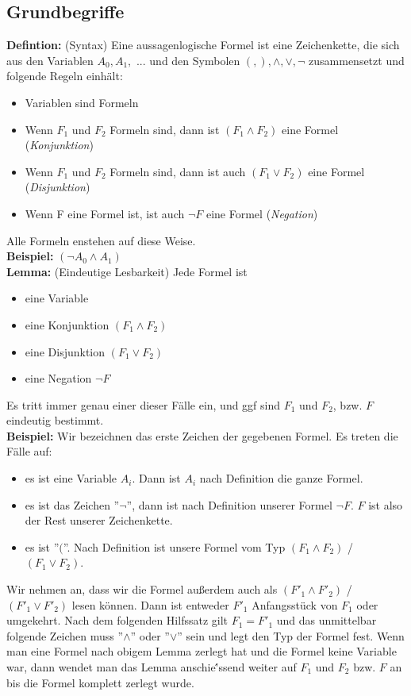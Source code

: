 \documentclass[a4paper]{scrartcl}
\begin{document}
\subsection{Grundbegriffe}
\textbf{Defintion:} (Syntax) Eine aussagenlogische Formel ist eine Zeichenkette, die sich aus den Variablen $A_0, A_1,$ ... und den Symbolen $(, ), \wedge, \vee, \neg$ zusammensetzt und folgende Regeln einhält:
\begin{itemize}
\item Variablen sind Formeln 
\item Wenn $F_1$ und $F_2$ Formeln sind, dann ist $(F_1 \wedge F_2)$ eine Formel (\textit{Konjunktion})
\item Wenn $F_1$ und $F_2$ Formeln sind, dann ist auch $(F_1 \vee F_2)$ eine Formel (\textit{Disjunktion})
\item Wenn F eine Formel ist, ist auch $\neg F$ eine Formel (\textit{Negation})
\end{itemize}
Alle Formeln enstehen auf diese Weise.\\
\textbf{Beispiel:} $(\neg A_0 \wedge A_1)$\\
\textbf{Lemma:} (Eindeutige Lesbarkeit) Jede Formel ist
\begin{itemize}
\item eine Variable
\item eine Konjunktion $(F_1 \wedge F_2)$
\item eine Disjunktion $(F_1 \vee F_2)$
\item eine Negation $\neg F$
\end{itemize}
Es tritt immer genau einer dieser Fälle ein, und ggf sind $F_1$ und $F_2$, bzw. $F$ eindeutig bestimmt.\\
\textbf{Beispiel:} Wir bezeichnen das erste Zeichen der gegebenen Formel. Es treten die Fälle auf:
\begin{itemize}
\item es ist eine Variable $A_i$. Dann ist $A_i$ nach Definition die ganze Formel.
\item es ist das Zeichen ''$\neg$'', dann ist nach Definition unserer Formel $\neg F$. $F$ ist also der Rest unserer Zeichenkette.
\item es ist ''$($''. Nach Definition ist unsere Formel vom Typ $(F_1 \wedge F_2)$ / $(F_1 \vee F_2)$.
\end{itemize}
Wir nehmen an, dass wir die Formel außerdem auch als  $(F'_1 \wedge F'_2)$ / $(F'_1 \vee F'_2)$ lesen können. Dann ist entweder $F'_1$ Anfangsstück von $F_1$ oder umgekehrt. Nach dem folgenden Hilfssatz gilt $F_1 = F'_1$ und das unmittelbar folgende Zeichen muss ''$\wedge$'' oder ''$\vee$'' sein und legt den Typ der Formel fest. Wenn man eine Formel nach obigem Lemma zerlegt hat und die Formel keine Variable war, dann wendet man das Lemma anschie{\''ss}end weiter auf $F_1$ und $F_2$ bzw. $F$ an bis die Formel komplett zerlegt wurde.\\
\end{document}

